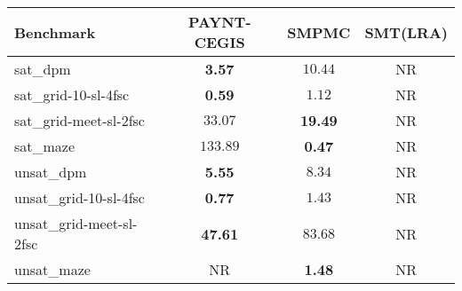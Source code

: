 \begin{tabular}{lccc}
\toprule
Benchmark & PAYNT-CEGIS & SMPMC & SMT(LRA) \\
\midrule
sat\_dpm & \textbf{3.57} & $10.44$ & NR \\
sat\_grid-10-sl-4fsc & \textbf{0.59} & $1.12$ & NR \\
sat\_grid-meet-sl-2fsc & $33.07$ & \textbf{19.49} & NR \\
sat\_maze & $133.89$ & \textbf{0.47} & NR \\
unsat\_dpm & \textbf{5.55} & $8.34$ & NR \\
unsat\_grid-10-sl-4fsc & \textbf{0.77} & $1.43$ & NR \\
unsat\_grid-meet-sl-2fsc & \textbf{47.61} & $83.68$ & NR \\
unsat\_maze & NR & \textbf{1.48} & NR \\
\bottomrule
\end{tabular}
